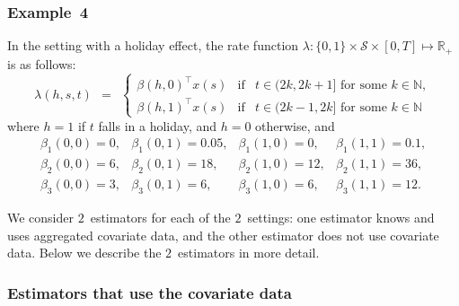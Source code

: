 \documentclass[article]{jss}
\newcommand{\NN}{\mathbb{N}}
\newcommand{\RR}{\mathbb{R}}
\begin{document}
\subsubsection{Example~4}

In the setting with a holiday effect, the rate function $\lambda : \{0,1\} \times \mathcal{S} \times [0,T] \mapsto \RR_{+}$ is as follows:
\[
\lambda(h,s,t) \ \ = \ \ \left\{\begin{array}{lcl}
\beta(h,0)^{\top} x(s) & \mbox{if} & t \in (2k,2k+1] \mbox{ for some } k \in \NN, \\
\beta(h,1)^{\top} x(s) & \mbox{if} & t \in (2k-1,2k] \mbox{ for some } k \in \NN
\end{array}\right.
\]
where $h = 1$ if $t$ falls in a holiday, and $h = 0$ otherwise, and
\[
\begin{array}{llll}
\beta_{1}(0,0) = 0, & \beta_{1}(0,1) = 0.05, & \beta_{1}(1,0) = 0, & \beta_{1}(1,1) = 0.1, \\
\beta_{2}(0,0) = 6, & \beta_{2}(0,1) = 18, & \beta_{2}(1,0) = 12, & \beta_{2}(1,1) = 36, \\
\beta_{3}(0,0) = 3, & \beta_{3}(0,1) = 6, & \beta_{3}(1,0) = 6, & \beta_{3}(1,1) = 12.
\end{array}
\]

We consider $2$~estimators for each of the $2$~settings: one estimator knows and uses aggregated covariate data, and the other estimator does not use covariate data.
Below we describe the $2$~estimators in more detail.


\subsubsection{Estimators that use the covariate data}
\end{document}
